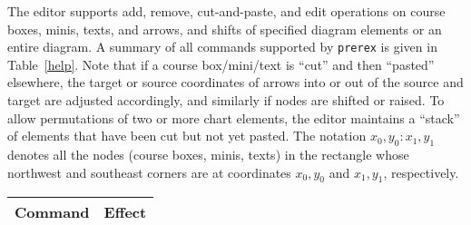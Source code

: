 \documentclass[11pt]{article}
\begin{document}
The editor supports add, remove, cut-and-paste, and edit operations
on course boxes, minis, texts, and arrows, and shifts of specified diagram elements or an entire diagram.  
A summary of all
commands supported by \texttt{prerex} is given in Table~\ref{help}.
Note that if a course box/mini/text is ``cut''
and then ``pasted'' elsewhere, the target or source coordinates of arrows into or out of the source and target are
adjusted accordingly, and similarly if nodes are shifted or raised. To allow permutations of two or more
chart elements, the
editor maintains a ``stack'' of elements that have been cut but not yet pasted.
The notation
$x_0,y_0:x_1,y_1$ 
denotes all the nodes (course boxes, minis, texts) in the rectangle whose northwest and southeast corners are at
coordinates
$x_0,y_0$ and $x_1,y_1$, respectively.
\begin{table}
\begin{center}\small
\begin{tabular}{|l|l|}
\hline
     \multicolumn{1}{|c|}{\textbf{Command}} &     \multicolumn{1}{|c|}{\textbf{Effect}} \\
\hline\hline


\end{tabular}
\end{center}
\end{table}
\end{document}
